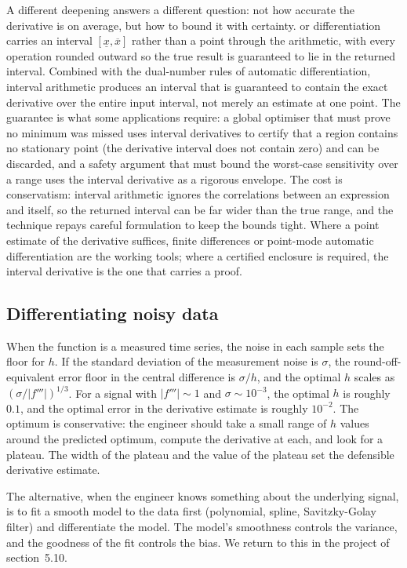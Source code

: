 \begin{mastery}
A different deepening answers a different question: not how accurate the
derivative is on average, but how to bound it with certainty.
 or  differentiation carries an
interval $[\underline{x}, \overline{x}]$ rather than a point through the
arithmetic, with every operation rounded outward so the true result is
guaranteed to lie in the returned interval. Combined with the dual-number
rules of automatic differentiation, interval arithmetic produces an
interval that is guaranteed to contain the exact derivative over the
entire input interval, not merely an estimate at one point. The
guarantee is what some applications require: a global optimiser that must
prove no minimum was missed uses interval derivatives to certify that a
region contains no stationary point (the derivative interval does not
contain zero) and can be discarded, and a safety argument that must bound
the worst-case sensitivity over a range uses the interval derivative as a
rigorous envelope. The cost is conservatism: interval arithmetic ignores
the correlations between an expression and itself, so the returned
interval can be far wider than the true range, and the technique repays
careful formulation to keep the bounds tight. Where a point estimate of
the derivative suffices, finite differences or point-mode automatic
differentiation are the working tools; where a certified enclosure is
required, the interval derivative is the one that carries a proof.
\end{mastery}

\subsection{Differentiating noisy data}

When the function is a measured time series, the noise in each
sample sets the floor for $h$. If the standard deviation of the
measurement noise is $\sigma$, the round-off-equivalent error
floor in the central difference is $\sigma / h$, and the optimal
$h$ scales as $(\sigma / |f'''|)^{1/3}$. For a signal with
$|f'''| \sim 1$ and $\sigma \sim 10^{-3}$, the optimal $h$ is
roughly $0.1$, and the optimal error in the derivative estimate
is roughly $10^{-2}$. The optimum is conservative: the engineer
should take a small range of $h$ values around the predicted
optimum, compute the derivative at each, and look for a plateau.
The width of the plateau and the value of the plateau set the
defensible derivative estimate.

The alternative, when the engineer knows something about the
underlying signal, is to fit a smooth model to the data first
(polynomial, spline, Savitzky-Golay filter) and differentiate the
model. The model's smoothness controls the variance, and the
goodness of the fit controls the bias. We return to this in the
project of section~5.10.

